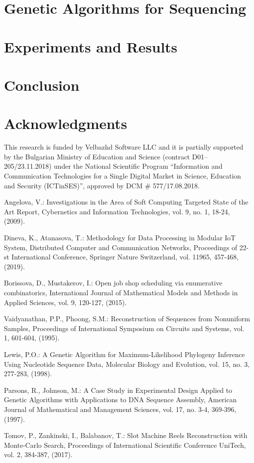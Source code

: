 \documentclass[11pt]{article}
\begin{document}
\section{Genetic Algorithms for Sequencing}

\section{Experiments and Results}

\section{Conclusion}

\section*{Acknowledgments}

This research is funded by Velbazhd Software LLC and it is partially supported by the Bulgarian Ministry of Education and Science (contract D01–205/23.11.2018) under the National Scientific Program ``Information and Communication Technologies for a Single Digital Market in Science, Education and Security (ICTinSES)'', approved by DCM \# 577/17.08.2018.

\begin{thebibliography}{99}

 Angelova, V.: Investigations in the Area of Soft Computing Targeted State of the Art Report, Cybernetics and Information Technologies, vol. 9, no. 1, 18-24, (2009).

 Dineva, K., Atanasova, T.: Methodology for Data Processing in Modular IoT System, Distributed Computer and Communication Networks, Proceedings of 22-st International Conference, Springer Nature Switzerland, vol. 11965, 457-468, (2019).

 Borissova, D., Mustakerov, I.: Open job shop scheduling via enumerative combinatorics, International Journal of Mathematical Models and Methods in Applied Sciences, vol. 9, 120-127, (2015).

 Vaidyanathan, P.P., Phoong, S.M.: Reconstruction of Sequences from Nonuniform Samples, Proceedings of International Symposium on Circuits and Systems, vol. 1, 601-604, (1995).

 Lewis, P.O.: A Genetic Algorithm for Maximum-Likelihood Phylogeny Inference Using Nucleotide Sequence Data, Molecular Biology and Evolution, vol. 15, no. 3, 277-283, (1998).

 Parsons, R., Johnson, M.: A Case Study in Experimental Design Applied to Genetic Algorithms with Applications to DNA Sequence Assembly, American Journal of Mathematical and Management Sciences, vol. 17, no. 3-4, 369-396, (1997).

 Tomov, P., Zankinski, I., Balabanov, T.: Slot Machine Reels Reconstruction with Monte-Carlo Search, Proceedings of International Scientific Conference UniTech, vol. 2, 384-387, (2017).

\end{thebibliography}
\end{document}

